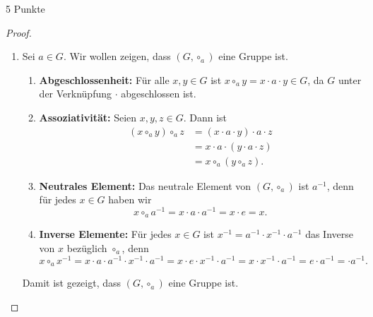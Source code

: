 \documentclass{problemset}
\begin{document}
\begin{problem} {5 Punkte}
\begin{proof}
\begin{enumerate}
        \item Sei $a \in G$. Wir wollen zeigen, dass $(G, \circ_a)$ eine Gruppe ist.
              \begin{enumerate}
                  \item \textbf{Abgeschlossenheit:} Für alle $x, y \in G$ ist $x \circ_a y = x \cdot a \cdot y \in G$, da $G$ unter der Verknüpfung $\cdot$ abgeschlossen ist.

                  \item \textbf{Assoziativität:} Seien $x, y, z \in G$. Dann ist
                        \begin{align*}
                            (x \circ_a y) \circ_a z & = (x \cdot a \cdot y) \cdot a \cdot z \\
                                                    & = x \cdot a \cdot (y \cdot a \cdot z) \\
                                                    & = x \circ_a (y \circ_a z).
                        \end{align*}

                  \item \textbf{Neutrales Element:} Das neutrale Element von $(G, \circ_a)$ ist $a^{-1}$, denn für jedes $x \in G$ haben wir
                        \[ x \circ_a a^{-1} = x \cdot a \cdot a^{-1} = x \cdot e = x. \]

                  \item \textbf{Inverse Elemente:} Für jedes $x \in G$ ist $x^{-1} = a^{-1} \cdot x^{-1} \cdot a^{-1}$ das Inverse von $x$ bezüglich $\circ_a$, denn
                        \[ x \circ_a x^{-1} = x \cdot a \cdot a^{-1} \cdot x^{-1} \cdot a^{-1} = x \cdot e \cdot x^{-1} \cdot a^{-1} =  x \cdot  x^{-1} \cdot a^{-1} = e \cdot a^{-1} = \cdot a^{-1}. \]

              \end{enumerate}
              Damit ist gezeigt, dass $(G, \circ_a)$ eine Gruppe ist. \checkmark
    \end{enumerate}
\end{proof}
\end{problem}
\end{document}
